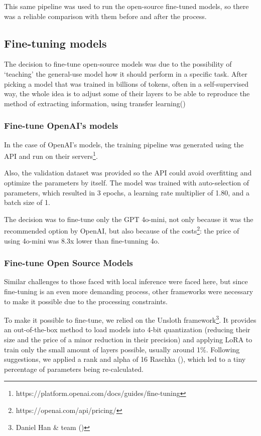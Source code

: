 \documentclass[
  12pt,
]{article}
\begin{document}
This same pipeline was used to run the open-source fine-tuned models, so
there was a reliable comparison with them before and after the process.

\subsection{Fine-tuning models}\label{fine-tuning-models}

The decision to fine-tune open-source models was due to the possibility
of `teaching' the general-use model how it should perform in a specific
task. After picking a model that was trained in billions of tokens,
often in a self-supervised way, the whole idea is to adjust some of
their layers to be able to reproduce the method of extracting
information, using transfer
learning()

\subsubsection{Fine-tune OpenAI's
models}\label{fine-tune-openais-models}

In the case of OpenAI's models, the training pipeline was generated
using the API and run on their servers\footnote{https://platform.openai.com/docs/guides/fine-tuning}.

Also, the validation dataset was provided so the API could avoid
overfitting and optimize the parameters by itself. The model was trained
with auto-selection of parameters, which resulted in 3 epochs, a
learning rate multiplier of 1.80, and a batch size of 1.

The decision was to fine-tune only the GPT 4o-mini, not only because it
was the recommended option by OpenAI, but also because of the
costs\footnote{https://openai.com/api/pricing/}: the price of using
4o-mini was 8.3x lower than fine-tunning 4o.

\subsubsection{Fine-tune Open Source
Models}\label{fine-tune-open-source-models}

Similar challenges to those faced with local inference were faced here,
but since fine-tuning is an even more demanding process, other
frameworks were necessary to make it possible due to the processing
constraints.

To make it possible to fine-tune, we relied on the Unsloth
framework\footnote{Daniel Han \& team
  ()}. It provides an
out-of-the-box method to load models into 4-bit quantization (reducing
their size and the price of a minor reduction in their precision) and
applying LoRA to train only the small amount of layers possible, usually
around 1\%. Following suggestions, we applied a rank and alpha of 16
Raschka (), which led to a tiny
percentage of parameters being re-calculated.
\end{document}
